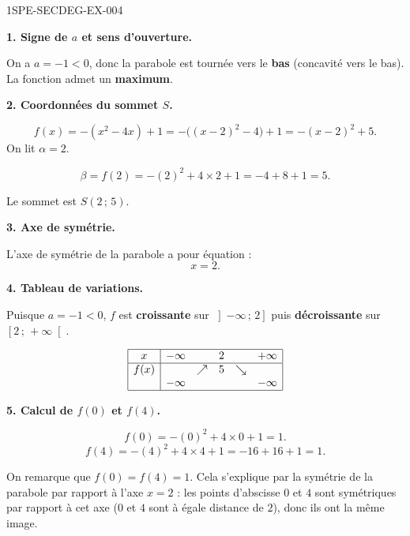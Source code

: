 \begin{corrige}{1SPE-SECDEG-EX-004}

\textbf{1. Signe de $a$ et sens d'ouverture.}


On a $a = -1 < 0$, donc la parabole est tournée vers le \textbf{bas} (concavité vers le bas). La fonction admet un \textbf{maximum}.

\medskip
\textbf{2. Coordonnées du sommet $S$.}


\[f(x)=-(x^2-4x)+1=-\bigl((x-2)^2-4\bigr)+1=-(x-2)^2+5.\]
On lit $\alpha=2$.

\[\beta = f(2) = -(2)^2 + 4 \times 2 + 1 = -4 + 8 + 1 = 5.\]

Le sommet est $S(2\,;\,5)$.

\medskip
\textbf{3. Axe de symétrie.}


L'axe de symétrie de la parabole a pour équation :
\[\boxed{x = 2.}\]

\medskip
\textbf{4. Tableau de variations.}

Puisque $a = -1 < 0$, $f$ est \textbf{croissante} sur $\left]-\infty\,;\,2\right]$ puis \textbf{décroissante} sur $\left[2\,;\,+\infty\right[$.

\[
\begin{array}{|c|ccccc|}
\hline
x & -\infty & & 2 & & +\infty \\
\hline
f(x) & & \nearrow & 5 & \searrow & \\
 & -\infty & & & & -\infty \\
\hline
\end{array}
\]

\medskip
\textbf{5. Calcul de $f(0)$ et $f(4)$.}


\[f(0) = -(0)^2 + 4\times 0 + 1 = 1.\]
\[f(4) = -(4)^2 + 4\times 4 + 1 = -16 + 16 + 1 = 1.\]

On remarque que $f(0) = f(4) = 1$. Cela s'explique par la symétrie de la parabole par rapport à l'axe $x = 2$ : les points d'abscisse $0$ et $4$ sont symétriques par rapport à cet axe ($0$ et $4$ sont à égale distance de $2$), donc ils ont la même image.

\end{corrige}
